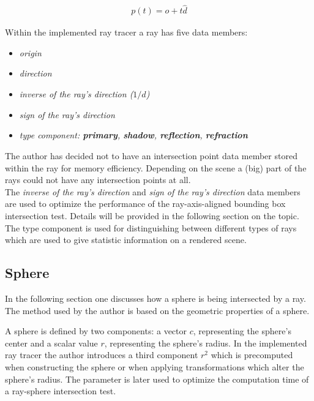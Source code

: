 \documentclass{article}
\begin{document}
\begin{align}
	p(t) = o + t\hat{d}
	\label{eq:ray}
\end{align}

Within the implemented ray tracer a ray has five data members: 
\begin{itemize}
	\itemsep0em 	%
	\item \textit{origin}
	\item \textit{direction}
	\item \textit{inverse of the ray's direction ($1 / \hat{d}$)}
	\item \textit{sign of the ray's direction}
	\item \textit{type component: \textbf{primary}, \textbf{shadow}, \textbf{reflection}, \textbf{refraction}}
\end{itemize}

\vspace*{\baselineskip}

The author has decided not to have an intersection point data member stored within the ray for memory efficiency. Depending on the scene a (big) part of the rays could not have any intersection points at all. \\
The \textit{inverse of the ray's direction} and \textit{sign of the ray's direction} data members are used to optimize the performance of the ray-axis-aligned bounding box intersection test. Details will be provided in the following section on the topic.\\
The type component is used for distinguishing between different types of rays which are used to give statistic information on a rendered scene.

\subsection{Sphere}

In the following section one discusses how a sphere is being intersected by a ray. The method used by the  author is based on the geometric properties of a sphere.

\vspace*{\baselineskip}

A sphere is defined by two components: a vector $c$, representing the sphere's center and a scalar value $r$, representing the sphere's radius. In the implemented ray tracer the author introduces a third component $r^2$ which is precomputed when constructing the sphere or when applying transformations which alter the sphere's radius. The parameter is later used to optimize the computation time of a ray-sphere intersection test.
\end{document}
